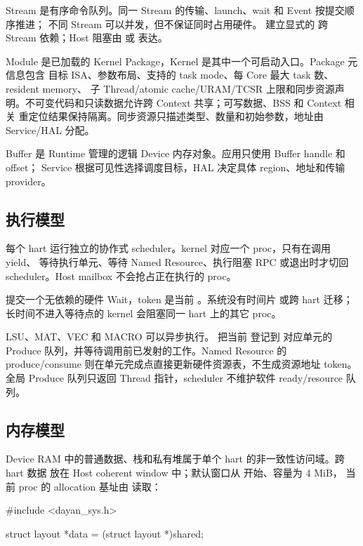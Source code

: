 \documentclass[../dayan_kernel_manual.tex]{subfiles}
\begin{document}
Stream 是有序命令队列。同一 Stream 的传输、launch、wait 和 Event 按提交顺序推进；
不同 Stream 可以并发，但不保证同时占用硬件。 建立显式的
跨 Stream 依赖；Host 阻塞由  或
 表达。

Module 是已加载的 Kernel Package，Kernel 是其中一个可启动入口。Package 元信息包含
目标 ISA、参数布局、支持的 task mode、每 Core 最大 task 数、resident memory、
子 Thread/atomic cache/URAM/TCSR 上限和同步资源声明。不可变代码和只读数据允许跨 Context
共享；可写数据、BSS 和 Context 相关
重定位结果保持隔离。同步资源只描述类型、数量和初始参数，地址由 Service/HAL 分配。

Buffer 是 Runtime 管理的逻辑 Device 内存对象。应用只使用 Buffer handle 和 offset；
Service 根据可见性选择调度目标，HAL 决定具体 region、地址和传输 provider。

\subsection{执行模型}

每个 hart 运行独立的协作式 scheduler。kernel 对应一个 proc，只有在调用 yield、
等待执行单元、等待 Named Resource、执行阻塞 RPC 或退出时才切回 scheduler。Host mailbox
不会抢占正在执行的 proc。

 提交一个无依赖的硬件 Wait，token 是当前 。系统没有时间片
或跨 hart 迁移；长时间不进入等待点的 kernel 会阻塞同一 hart 上的其它 proc。

LSU、MAT、VEC 和 MACRO 可以异步执行。 把当前  登记到
对应单元的 Produce 队列，并等待调用前已发射的工作。Named Resource 的 produce/consume
则在单元完成点直接更新硬件资源表，不生成资源地址 token。全局 Produce 队列只返回
Thread 指针，scheduler 不维护软件 ready/resource 队列。

\subsection{内存模型}

Device RAM 中的普通数据、栈和私有堆属于单个 hart 的非一致性访问域。跨 hart 数据
放在 Host coherent window 中；默认窗口从  开始、容量为 4 MiB，
当前 proc 的 allocation 基址由  读取：

\begin{dayancode}
#include <dayan_sys.h>

struct layout *data = (struct layout *)shared;
\end{dayancode}
\end{document}
